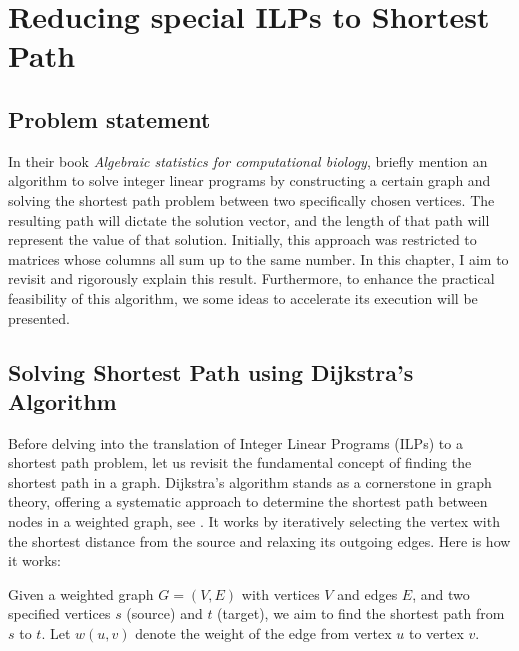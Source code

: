 \chapter{Reducing special ILPs to Shortest Path}
\section{Problem statement}
In their book \textit{Algebraic statistics for computational biology}, \cite{algebraic_statistics} briefly mention an algorithm to solve integer linear programs by constructing a certain graph and solving the shortest path problem between two specifically chosen vertices. The resulting path will dictate the solution vector, and the length of that path will represent the value of that solution. Initially, this approach was restricted to matrices whose columns all sum up to the same number. In this chapter, I aim to revisit and rigorously explain this result. Furthermore, to enhance the practical feasibility of this algorithm, we some ideas to accelerate its execution will be presented.

\section{Solving Shortest Path using Dijkstra's Algorithm}
Before delving into the translation of Integer Linear Programs (ILPs) to a shortest path problem, let us revisit the fundamental concept of finding the shortest path in a graph. Dijkstra's algorithm stands as a cornerstone in graph theory, offering a systematic approach to determine the shortest path between nodes in a weighted graph, see \cite{introduction_to_algorithms}. It works by iteratively selecting the vertex with the shortest distance from the source and relaxing its outgoing edges. Here is how it works:

Given a weighted graph $G = (V, E)$ with vertices $V$ and edges $E$, and two specified vertices $s$ (source) and $t$ (target), we aim to find the shortest path from $s$ to $t$. Let $w(u, v)$ denote the weight of the edge from vertex $u$ to vertex $v$.

